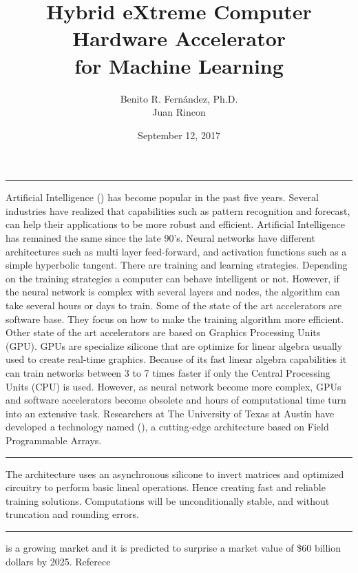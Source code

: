 \documentclass[12pt]{article}
\author{
    Benito R. Fern\'andez, Ph.D.\\
    Juan Rincon
    }
\title{\huge{Hybrid eXtreme Computer \cool{HxC}}\\
Hardware Accelerator\\
for Machine Learning}
\date{September 12, 2017}
\begin{document}
	\maketitle
	\vspace{10.0mm}
	\centerline{\huge\textbf{}}
    \vspace{5.0mm}
    \centerline{\LARGE\textbf{\color{red}\cool{[ P R O P R I E T A R Y ]}}}
    \clearpage
	\vspace{10mm} 
    \centerline{\Large\textbf{}}
    \vspace{2mm}\hrule
        Artificial Intelligence () has become popular in the past five years. Several industries have realized that capabilities such as pattern recognition and forecast, can help their applications to be more robust and efficient.  Artificial Intelligence has remained the same since the late 90's. Neural networks have different architectures such as multi layer feed-forward, and activation functions such as a simple hyperbolic tangent. There are training and learning strategies. Depending on the training strategies a computer can behave intelligent or not. However, if the neural network is complex with several layers and nodes, the algorithm can take several hours or days to train. Some of the state of the art accelerators are software base. They focus on how to make the training algorithm more efficient. Other state of the art accelerators are based on Graphics Processing Units (GPU). GPUs are specialize silicone that are optimize for linear algebra usually used to create real-time graphics. Because of its fast linear algebra capabilities it can train networks between 3 to 7 times faster if only the Central Processing Units (CPU) is used. However, as neural network become more complex, GPUs and software accelerators become obsolete and hours of computational time turn into an extensive task. Researchers at The University of Texas at Austin have developed a technology named (), a cutting-edge architecture based on Field Programmable Arrays. 
    \par
	\vspace{10mm} 
    \centerline{\Large\textbf{}}
    \vspace{2mm}\hrule
        The  architecture uses an asynchronous silicone to invert matrices and optimized circuitry to perform basic lineal operations. Hence creating fast and reliable training solutions. Computations will be unconditionally stable, and without truncation and rounding errors.
    \par        
	\vspace{10mm} 
    \centerline{\Large\textbf{}}
    \vspace{2mm}\hrule
     is a growing market and it is predicted to surprise a market value of \$60 billion dollars by 2025. {\color{rojo}Referece}
    
\end{document}
